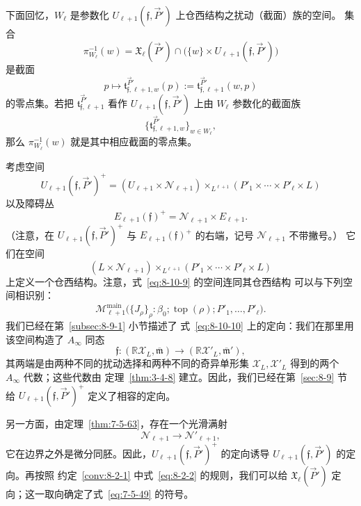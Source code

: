 下面回忆，$W_\ell$ 是参数化
$U_{\ell+1}(\mathfrak f,\vec P')$ 上仓西结构之扰动（截面）族的空间。
集合
\[
 \pi_{W_\ell}^{-1}(w)
 =\mathfrak X_\ell(\vec P')\cap
 \bigl(\{w\}\times U_{\ell+1}(\mathfrak f,\vec P')\bigr)
\]
是截面
\[
 p\longmapsto
 \mathfrak t_{\mathfrak f,\ell+1,w}^{\vec P'}(p)
 :=\mathfrak t_{\mathfrak f,\ell+1}^{\vec P'}(w,p)
\]
的零点集。若把 $\mathfrak t_{\mathfrak f,\ell+1}^{\vec P'}$ 看作
$U_{\ell+1}(\mathfrak f,\vec P')$ 上由 $W_\ell$ 参数化的截面族
\[
 \bigl\{\mathfrak t_{\mathfrak f,\ell+1,w}^{\vec P'}
 \bigr\}_{w\in W_\ell},
\]
那么 $\pi_{W_\ell}^{-1}(w)$ 就是其中相应截面的零点集。

考虑空间
\[
 U_{\ell+1}(\mathfrak f,\vec P')^+
 =(U_{\ell+1}\times\mathcal N_{\ell+1})
 \mathbin{\times_{L^{\ell+1}}}
 (P'_1\times\cdots\times P'_\ell\times L)
\]
以及障碍丛
\[
 E_{\ell+1}(\mathfrak f)^+
 =\mathcal N_{\ell+1}\times E_{\ell+1}.
\]
（注意，在 $U_{\ell+1}(\mathfrak f,\vec P')^+$ 与
$E_{\ell+1}(\mathfrak f)^+$ 的右端，记号 $\mathcal N_{\ell+1}$ 不带撇号。）
它们在空间
\begin{equation}
 (L\times\mathcal N_{\ell+1})
 \mathbin{\times_{L^{\ell+1}}}
 (P'_1\times\cdots\times P'_\ell\times L)
 \tag{8.10.9}\label{eq:8-10-9}
\end{equation}
上定义一个仓西结构。注意，式~\eqref{eq:8-10-9} 的空间连同其仓西结构
可以与下列空间相识别：
\begin{equation}
 \mathcal M_{\ell+1}^{\mathrm{main}}
 \bigl(\{J_\rho\}_\rho:\beta_0;
 \operatorname{top}(\rho);P'_1,\ldots,P'_\ell\bigr).
 \tag{8.10.10}\label{eq:8-10-10}
\end{equation}
我们已经在第~\ref{subsec:8-9-1} 小节描述了
式~\eqref{eq:8-10-10} 上的定向：我们在那里用该空间构造了
$A_\infty$ 同态
\[
 \mathfrak f\colon
 (\mathbb R\mathcal X_L,\overline{\mathfrak m})
 \longrightarrow
 (\mathbb R\mathcal X'_L,\overline{\mathfrak m}'),
\]
其两端是由两种不同的扰动选择和两种不同的奇异单形集
$\mathcal X_L,\mathcal X'_L$ 得到的两个 $A_\infty$ 代数；这些代数由
定理~\ref{thm:3-4-8} 建立。因此，我们已经在第~\ref{sec:8-9} 节给
$U_{\ell+1}(\mathfrak f,\vec P')^+$ 定义了相容的定向。

另一方面，由定理~\ref{thm:7-5-63}，存在一个光滑满射
\[
 \mathcal N_{\ell+1}\longrightarrow\mathcal N'_{\ell+1},
\]
它在边界之外是微分同胚。因此，$U_{\ell+1}(\mathfrak f,\vec P')^+$
的定向诱导 $U_{\ell+1}(\mathfrak f,\vec P')$ 的定向。再按照
约定~\ref{conv:8-2-1} 中式~\eqref{eq:8-2-2} 的规则，我们可以给
$\mathfrak X_\ell(\vec P')$ 定向；这一取向确定了式~\eqref{eq:7-5-49}
的符号。
